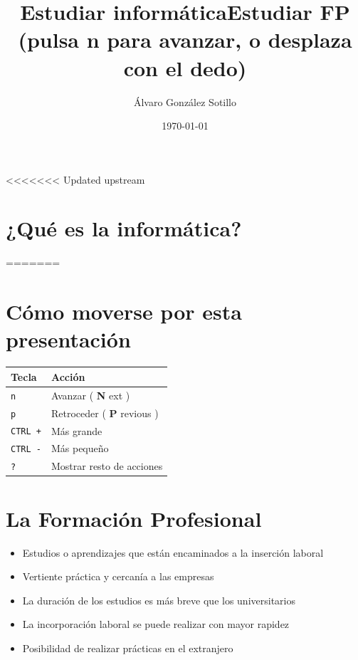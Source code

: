 \documentclass{article}
\author{Álvaro González Sotillo}
\date{\today}
\title{Estudiar informática}
\title{Estudiar FP\\\medskip
\large  (pulsa n para avanzar, o desplaza con el dedo)}
\begin{document}
\maketitle
\captionsetup{font=scriptsize}


<<<<<<< Updated upstream
\section{¿Qué es la informática?}
\label{sec:org0000003}
=======
\section*{Cómo moverse por esta presentación}
\label{sec:org0000000}
\begin{center}
\begin{tabular}{ll}
\hline
Tecla & Acción\\
\hline
\texttt{n} & Avanzar ( \textbf{N} ext )\\
\texttt{p} & Retroceder ( \textbf{P} revious )\\
\texttt{CTRL +} & Más grande\\
\texttt{CTRL -} & Más pequeño\\
\texttt{?} & Mostrar resto de acciones\\
\hline
\end{tabular}
\end{center}



\section*{La Formación Profesional}
\label{sec:org0000012}
\begin{itemize}
\item Estudios o aprendizajes que están encaminados a la inserción laboral
\item Vertiente práctica y cercanía a las empresas
\item La duración de los estudios es más breve que los universitarios
\item La incorporación laboral se puede realizar con mayor rapidez
\item Posibilidad de realizar prácticas en el extranjero
\end{itemize}
\end{document}
